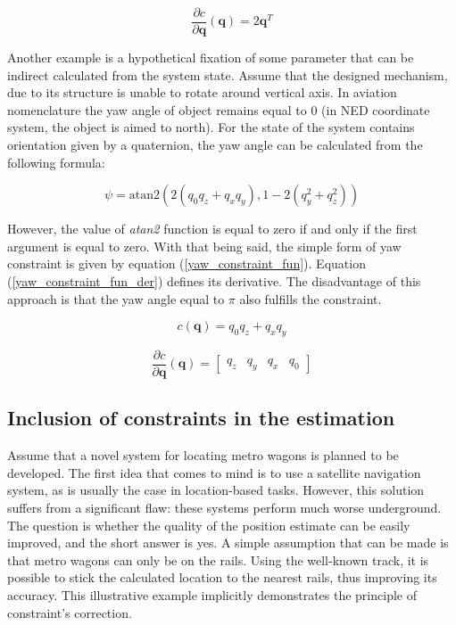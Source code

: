 \begin{equation}
	\frac{\partial c}{\partial \bm{q}}  \left( \bm{q} \right) = 2\bm{q}^T
	\label{quat_constraint_fun_der}
\end{equation}

Another example is a hypothetical fixation of some parameter that can be indirect calculated from the system state. Assume that the designed mechanism, due to its structure is unable to rotate around vertical axis. In aviation nomenclature the yaw angle of object remains equal to 0 (in NED coordinate system, the object is aimed to north). For the state of the system contains orientation given by a quaternion, the yaw angle can be calculated from the following formula:

\begin{equation}
	\psi = {\mbox{atan2}}\left(2(q_{0}q_{z}+q_{x}q_{y}),1-2(q_{y}^{2}+q_{z}^{2})\right)
\end{equation}

However, the value of \textit{atan2} function is equal to zero if and only if the first argument is equal to zero. With that being said, the simple form of yaw constraint is given by equation (\ref{yaw_constraint_fun}). Equation (\ref{yaw_constraint_fun_der}) defines its derivative. The disadvantage of this approach is that the yaw angle equal to $\pi$ also fulfills the constraint.

\begin{equation}
	c \left( \bm{q} \right) = q_{0}q_{z}+q_{x}q_{y}
	\label{yaw_constraint_fun}
\end{equation}

\begin{equation}
	\frac{\partial c}{\partial \bm{q}}  \left( \bm{q} \right) =
	\begin{bmatrix}
		q_{z} &  q_{y} &  q_{x} &  q_{0}
	\end{bmatrix}
	\label{yaw_constraint_fun_der}
\end{equation}


\subsection{Inclusion of constraints in the estimation}

Assume that a novel system for locating metro wagons is planned to be developed. The first idea that comes to mind is to use a satellite navigation system, as is usually the case in location-based tasks. However, this solution suffers from a significant flaw: these systems perform much worse underground. The question is whether the quality of the position estimate can be easily improved, and the short answer is yes. A simple assumption that can be made is that metro wagons can only be on the rails. Using the well-known track, it is possible to stick the calculated location to the nearest rails, thus improving its accuracy.
This illustrative example implicitly demonstrates the principle of constraint's correction.\\

